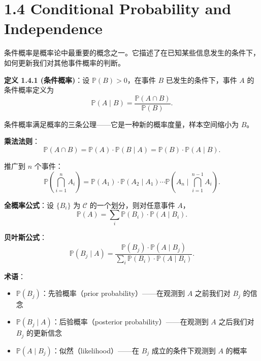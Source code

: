 \section{1.4 Conditional Probability and Independence}\label{sec:1.4}

条件概率是概率论中最重要的概念之一。它描述了在已知某些信息发生的条件下，如何更新我们对其他事件概率的判断。

\begin{remark}
\textbf{定义 1.4.1 (条件概率)}：设 $\mathbb{P}(B) > 0$，在事件 $B$ 已发生的条件下，事件 $A$ 的条件概率定义为
\[
\mathbb{P}(A \mid B) = \frac{\mathbb{P}(A \cap B)}{\mathbb{P}(B)}.
\tag{1.4.1}\label{eq:conditional-prob-ch1}
\]
\end{remark}

条件概率满足概率的三条公理——它是一种新的概率度量，样本空间缩小为 $B$。

\textbf{乘法法则}：
\[
\mathbb{P}(A \cap B) = \mathbb{P}(A) \cdot \mathbb{P}(B \mid A) = \mathbb{P}(B) \cdot \mathbb{P}(A \mid B).
\tag{1.4.2}\label{eq:multiplication-rule-ch1}
\]

推广到 $n$ 个事件：
\[
\mathbb{P}\left(\bigcap_{i=1}^{n} A_i\right) = \mathbb{P}(A_1) \cdot \mathbb{P}(A_2 \mid A_1) \cdots \mathbb{P}\left(A_n \mid \bigcap_{i=1}^{n-1} A_i\right).
\tag{1.4.3}\label{eq:multiplication-n-ch1}
\]

\begin{remark}
\textbf{全概率公式}：设 $\{B_i\}$ 为 $\mathcal{C}$ 的一个划分，则对任意事件 $A$，
\[
\mathbb{P}(A) = \sum_i \mathbb{P}(B_i) \cdot \mathbb{P}(A \mid B_i).
\tag{1.4.4}\label{eq:total-probability-ch1}
\]
\end{remark}

\begin{remark}
\textbf{贝叶斯公式}：
\[
\mathbb{P}(B_j \mid A) = \frac{\mathbb{P}(B_j) \cdot \mathbb{P}(A \mid B_j)}{\sum_i \mathbb{P}(B_i) \cdot \mathbb{P}(A \mid B_i)}.
\tag{1.4.5}\label{eq:bayes-ch1}
\]

\textbf{术语}：
\begin{itemize}
    \item $\mathbb{P}(B_j)$：先验概率（prior probability）——在观测到 $A$ 之前我们对 $B_j$ 的信念
    \item $\mathbb{P}(B_j \mid A)$：后验概率（posterior probability）——在观测到 $A$ 之后我们对 $B_j$ 的更新信念
    \item $\mathbb{P}(A \mid B_j)$：似然（likelihood）——在 $B_j$ 成立的条件下观测到 $A$ 的概率
\end{itemize}
\end{remark}

